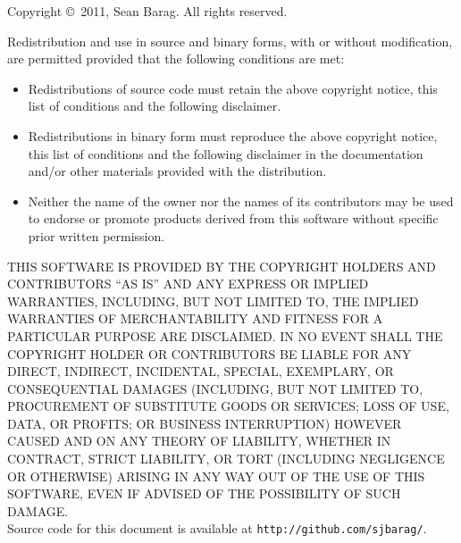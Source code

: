 Copyright \copyright\ 2011, Sean Barag.  All rights reserved.

Redistribution and use in source and binary forms, with or without
modification, are permitted provided that the following conditions are met:
\begin{itemize}
\item Redistributions of source code must retain the above copyright notice, this
  list of conditions and the following disclaimer.
\item Redistributions in binary form must reproduce the above copyright notice, this
  list of conditions and the following disclaimer in the documentation and/or
  other materials provided with the distribution.
\item Neither the name of the owner nor the names of its contributors may be
  used to endorse or promote products derived from this software without specific
  prior written permission.
\end{itemize}

THIS SOFTWARE IS PROVIDED BY THE COPYRIGHT HOLDERS AND CONTRIBUTORS ``AS IS'' AND
ANY EXPRESS OR IMPLIED WARRANTIES, INCLUDING, BUT NOT LIMITED TO, THE IMPLIED
WARRANTIES OF MERCHANTABILITY AND FITNESS FOR A PARTICULAR PURPOSE ARE
DISCLAIMED. IN NO EVENT SHALL THE COPYRIGHT HOLDER OR CONTRIBUTORS BE LIABLE
FOR ANY DIRECT, INDIRECT, INCIDENTAL, SPECIAL, EXEMPLARY, OR CONSEQUENTIAL
DAMAGES (INCLUDING, BUT NOT LIMITED TO, PROCUREMENT OF SUBSTITUTE GOODS OR
SERVICES; LOSS OF USE, DATA, OR PROFITS; OR BUSINESS INTERRUPTION) HOWEVER
CAUSED AND ON ANY THEORY OF LIABILITY, WHETHER IN CONTRACT, STRICT LIABILITY,
OR TORT (INCLUDING NEGLIGENCE OR OTHERWISE) ARISING IN ANY WAY OUT OF THE USE
OF THIS SOFTWARE, EVEN IF ADVISED OF THE POSSIBILITY OF SUCH DAMAGE.\\

Source code for this document is available at \texttt{http://github.com/sjbarag/}.
